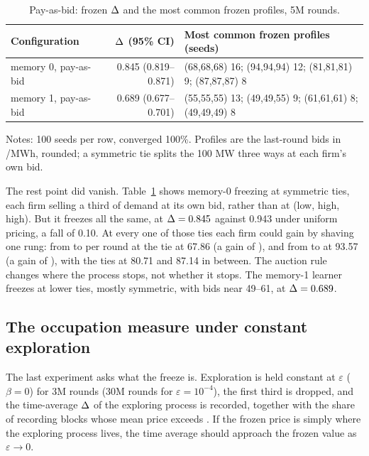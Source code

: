 \begin{table}[htbp]
\centering
\caption{Pay-as-bid: frozen $\Delta$ and the most common frozen profiles, 5M rounds.}
\label{tab:payasbid}
\small
\begin{tabular}{@{}lrl@{}}
\toprule
Configuration & $\Delta$ (95\% CI) & Most common frozen profiles (seeds) \\
\midrule
memory 0, pay-as-bid & 0.845 (0.819--0.871) & (68,68,68) 16; (94,94,94) 12; (81,81,81) 9; (87,87,87) 8 \\
memory 1, pay-as-bid & 0.689 (0.677--0.701) & (55,55,55) 13; (49,49,55) 9; (61,61,61) 8; (49,49,49) 8 \\
\bottomrule
\end{tabular}
\par\smallskip
\footnotesize Notes: 100 seeds per row, converged 100\%. Profiles are the last-round bids in \eur{}/MWh, rounded; a symmetric tie splits the 100 MW three ways at each firm's own bid.
\end{table}

The rest point did vanish. Table~\ref{tab:payasbid} shows memory-0 freezing at symmetric ties, each firm selling a third of demand at its own bid, rather than at (low, high, high). But it freezes all the same, at $\Delta = 0.845$ against 0.943 under uniform pricing, a fall of 0.10. At every one of those ties each firm could gain by shaving one rung: from  to  per round at the tie at 67.86 (a gain of ), and from  to  at 93.57 (a gain of ), with the ties at 80.71 and 87.14 in between. The auction rule changes where the process stops, not whether it stops. The memory-1 learner freezes at lower ties, mostly symmetric, with bids near 49--61, at $\Delta = 0.689$.

\subsection{The occupation measure under constant exploration}\label{sec:occupation}

The last experiment asks what the freeze is. Exploration is held constant at $\varepsilon$ ($\beta = 0$) for 3M rounds (30M rounds for $\varepsilon = 10^{-4}$), the first third is dropped, and the time-average $\Delta$ of the exploring process is recorded, together with the share of recording blocks whose mean price exceeds . If the frozen price is simply where the exploring process lives, the time average should approach the frozen value as $\varepsilon \to 0$.

